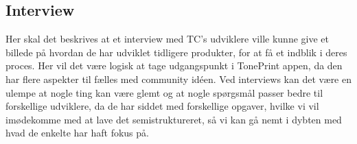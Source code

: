 \subsection*{Interview}
\label{MethodInterview}
Her skal det beskrives at et interview med TC's udviklere ville kunne give et billede på hvordan de har udviklet tidligere produkter, for at få et indblik i deres proces. Her vil det være logisk at tage udgangspunkt i TonePrint appen, da den har flere aspekter til fælles med community idéen. Ved interviews kan det være en ulempe at nogle ting kan være glemt og at nogle spørgsmål passer bedre til forskellige udviklere, da de har siddet med forskellige opgaver, hvilke vi vil imødekomme med at lave det semistruktureret, så vi kan gå nemt i dybten med hvad de enkelte har haft fokus på. 

